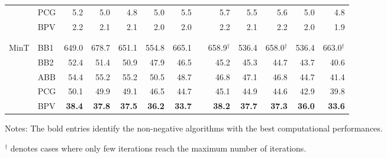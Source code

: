 \documentclass[11pt]{article}
\newcommand{\0}{\phantom{0}}
\begin{document}
\begin{table}[p]
\begin{threeparttable}
\begin{tabular}{llrrrrrrrrrrr}
			& PCG & 5.2 & 5.0 & 4.8 & 5.0 & 5.5 & & 5.7 & 5.5 & 5.6 & 5.0 & 4.8 \\
			& BPV & 2.2 & 2.1 & 2.1 & 2.0 & 2.0 & & 2.2 & 2.1 & 2.2 & 2.0 & 1.9 \\ \\[-0.3cm]
			\cline{3-7} \cline{9-13} \\[-0.3cm]
			MinT & BB1 & 649.0 & 678.7 & 651.1 & 554.8 & 665.1 & & 658.9$^\dagger$ & 536.4 & 658.0$^\dagger$ & 536.4 & 663.0$^\dagger$ \\
			& BB2 & 52.4 & 51.4 & 50.9 & 47.9 & 46.5 & & 45.2 & 45.3 & 44.7 & 43.7 & 40.6 \\
			& ABB & 54.4 & 55.2 & 55.2 & 50.5 & 48.7 & & 46.8 & 47.1 & 46.8 & 44.7 & 41.4 \\
			& PCG & 50.1 & 49.9 & 49.1 & 46.5 & 44.7 & & 45.1 & 44.9 & 44.6 & 42.9 & 39.8 \\
			& BPV & {\bf 38.4} & {\bf 37.8} & {\bf 37.5} & {\bf 36.2} & {\bf 33.7} & & {\bf 38.2} & {\bf 37.7} & {\bf 37.3} & {\bf 36.0} & {\bf 33.6} \\
			\bottomrule
		\end{tabular}
		\begin{tablenotes}
			\item [] Notes: The bold entries identify the non-negative algorithms with the best computational performances.
			\item [] $^\dagger$ denotes cases where only few iterations reach the maximum number of iterations.
		\end{tablenotes}
	\end{threeparttable}
\end{table}	
\end{document}
